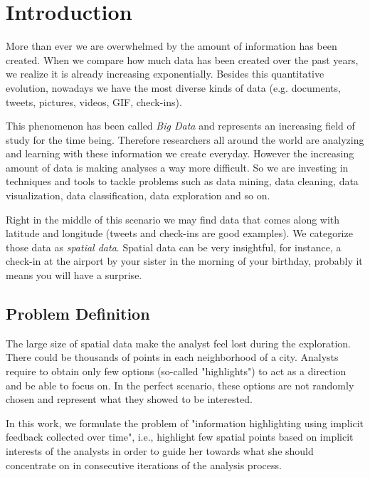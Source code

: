 \chapter{Introduction}
\label{chap:intro}

More than ever we are overwhelmed by the amount of information has been created.
When we compare how much data has been created over the past years, we realize
it is already increasing exponentially.
Besides this quantitative evolution, nowadays
we have the most diverse kinds of data
(e.g. documents, tweets, pictures, videos, GIF, check-ins).

This phenomenon has been called \textit{Big Data} and represents an increasing field of study
for the time being. Therefore researchers all around the world
are analyzing and learning with these information we create everyday.
However the increasing amount of data is making analyses a way more difficult.
So we are investing in techniques and tools to tackle problems such as data mining, data cleaning,
data visualization, data classification, data exploration and so on.

Right in the middle of this scenario we may find data that comes along with latitude and longitude
(tweets and check-ins are good examples). We categorize those data as \textit{spatial data}.
Spatial data can be very insightful, for instance, a check-in at the airport by your sister
in the morning of your birthday, probably it means you will have a surprise.


\section{Problem Definition}

The large size of spatial data make the analyst feel lost during the exploration.
There could be thousands of points in each neighborhood of a city. Analysts require to obtain
only few options (so-called "highlights") to act as a direction and be able to focus on.
In the perfect scenario, these options are not randomly chosen and represent what they showed to be interested.

In this work, we formulate the problem of "information highlighting using implicit feedback collected over time", i.e.,
highlight few spatial points based on implicit interests of the analysts in order to guide her
towards what she should concentrate on in consecutive iterations of the analysis process.


